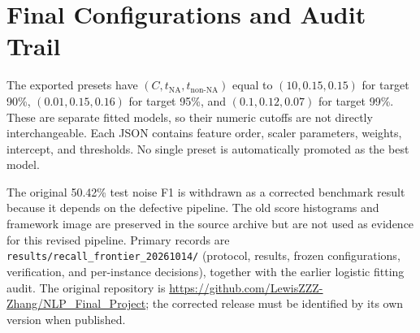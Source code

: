 \documentclass[11pt]{article}
\begin{document}
\appendix
\section{Final Configurations and Audit Trail}
The exported presets have $(C,t_{\mathrm{NA}},t_{\mathrm{non\mbox{-}NA}})$ equal to $(10,0.15,0.15)$ for target 90\%, $(0.01,0.15,0.16)$ for target 95\%, and $(0.1,0.12,0.07)$ for target 99\%. These are separate fitted models, so their numeric cutoffs are not directly interchangeable. Each JSON contains feature order, scaler parameters, weights, intercept, and thresholds. No single preset is automatically promoted as the best model.

The original 50.42\% test noise F1 is withdrawn as a corrected benchmark result because it depends on the defective pipeline. The old score histograms and framework image are preserved in the source archive but are not used as evidence for this revised pipeline. Primary records are \texttt{results/recall\_frontier\_20261014/} (protocol, results, frozen configurations, verification, and per-instance decisions), together with the earlier logistic fitting audit. The original repository is \url{https://github.com/LewisZZZ-Zhang/NLP_Final_Project}; the corrected release must be identified by its own version when published.


\end{document}

